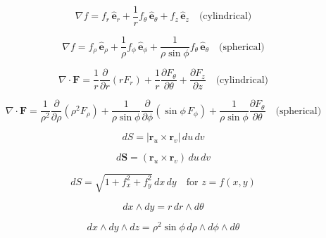 \[
\boxed{
    \nabla f
    =
    f_r\,\widehat{\mathbf e}_r
    +
    \frac1r f_\theta\,\widehat{\mathbf e}_\theta
    +
    f_z\,\widehat{\mathbf e}_z
    \quad\text{(cylindrical)}
}
\]

\[
\boxed{
    \nabla f
    =
    f_\rho\,\widehat{\mathbf e}_\rho
    +
    \frac1\rho f_\phi\,\widehat{\mathbf e}_\phi
    +
    \frac1{\rho\sin\phi}f_\theta\,\widehat{\mathbf e}_\theta
    \quad\text{(spherical)}
}
\]

\[
\boxed{
    \nabla\cdot\mathbf F
    =
    \frac1r\frac{\partial}{\partial r}(rF_r)
    +
    \frac1r\frac{\partial F_\theta}{\partial\theta}
    +
    \frac{\partial F_z}{\partial z}
    \quad\text{(cylindrical)}
}
\]

\[
\boxed{
    \nabla\cdot\mathbf F
    =
    \frac1{\rho^2}
    \frac{\partial}{\partial\rho}(\rho^2F_\rho)
    +
    \frac1{\rho\sin\phi}
    \frac{\partial}{\partial\phi}(\sin\phi\,F_\phi)
    +
    \frac1{\rho\sin\phi}
    \frac{\partial F_\theta}{\partial\theta}
    \quad\text{(spherical)}
}
\]

\[
\boxed{
    dS=|\mathbf r_u\times\mathbf r_v|\,du\,dv
}
\]

\[
\boxed{
    d\mathbf S=(\mathbf r_u\times\mathbf r_v)\,du\,dv
}
\]

\[
\boxed{
    dS=\sqrt{1+f_x^2+f_y^2}\,dx\,dy
    \quad\text{for }z=f(x,y)
}
\]

\[
\boxed{
    dx\wedge dy=r\,dr\wedge d\theta
}
\]

\[
\boxed{
    dx\wedge dy\wedge dz
    =
    \rho^2\sin\phi\,
    d\rho\wedge d\phi\wedge d\theta
}
\]